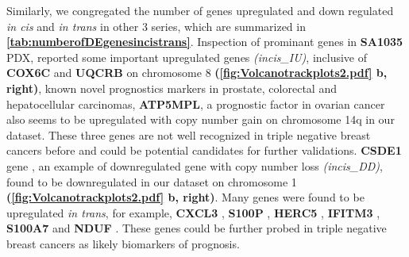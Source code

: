 Similarly, we congregated the number of genes upregulated and down regulated \textit{in cis} and \textit{in trans} in other 3 series, which are summarized in \textbf{\autoref{tab:numberofDEgenesincistrans}}.
 Inspection of prominant genes in \textbf{SA1035} PDX, reported some important upregulated genes \textit{(incis\_IU)}, inclusive of \textbf{COX6C} \cite{yang2018overexpression,chang2017estrogen} and 
 \textbf{UQCRB} \cite{kim2017mitochondrial,park2017mitochondrial} on chromosome 8 \textbf{(\autoref{fig:Volcanotrackplots2.pdf} b, right)}, known novel prognostics markers in prostate, colorectal and hepatocellular carcinomas, \textbf{ATP5MPL}, a prognostic factor in ovarian cancer also seems to be upregulated with copy number gain on chromosome 14q in our dataset. These three genes are not well recognized in triple negative breast cancers before and could be potential candidates for further validations. \textbf{CSDE1} gene \cite{martinez2019unr}, an example of downregulated gene with copy number loss \textit{(incis\_DD)}, found to be downregulated in our dataset on chromosome 1 \textbf{(\autoref{fig:Volcanotrackplots2.pdf} b, right)}. Many genes were found to be upregulated \textit{in trans}, for example,  \textbf{CXCL3} \cite{gui2016overexpression, karin2020cxcr3}, \textbf{S100P} \cite{arumugam2011s100p,cong2020calcium}, 
\textbf{HERC5} \cite{wrage2015identification}, \textbf{IFITM3} \cite{liu2019ifitm3}, \textbf{S100A7} \cite{zhang2019clinical, mayama2018olfm} and \textbf{NDUF} \cite{li2015down}. These genes could be further probed in triple negative breast cancers as likely biomarkers of prognosis.



